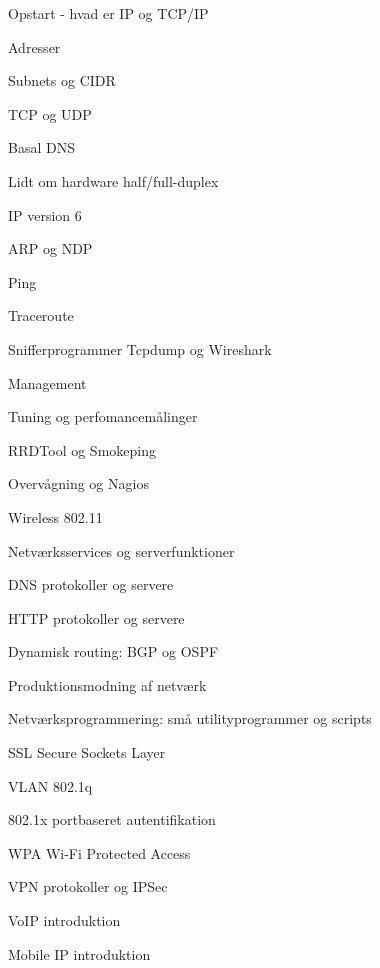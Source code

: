\documentclass[Screen16to9,17pt]{foils}
\begin{document}

\begin{list1}
\item Opstart - hvad er IP og TCP/IP
\item Adresser
\item Subnets og CIDR
\item TCP og UDP
\item Basal DNS
\item Lidt om hardware half/full-duplex

\end{list1}




\begin{list1}
\item IP version 6
\item ARP og NDP
\item Ping
\item Traceroute
\item Snifferprogrammer Tcpdump og Wireshark
\item Management
\item Tuning og perfomancemålinger
\item RRDTool og Smokeping
\item Overvågning og Nagios
\item Wireless 802.11
\end{list1}



\begin{list1}
\item Netværksservices og serverfunktioner
\item DNS protokoller og servere
\item HTTP protokoller og servere
\item Dynamisk routing: BGP og OSPF
\item Produktionsmodning af netværk
\item Netværksprogrammering: små utilityprogrammer og scripts
\end{list1}


\begin{list1}
\item SSL Secure Sockets Layer
\item VLAN 802.1q
\item 802.1x portbaseret autentifikation
\item WPA Wi-Fi Protected Access
\item VPN protokoller og IPSec
\item VoIP introduktion
\item Mobile IP introduktion
\end{list1}
\end{document}
